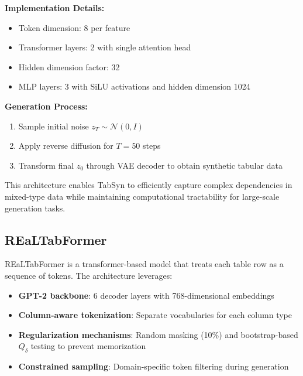 \documentclass[conference]{IEEEtran}
\begin{document}
\textbf{Implementation Details:}
\begin{itemize}
    \item Token dimension: 8 per feature
    \item Transformer layers: 2 with single attention head
    \item Hidden dimension factor: 32
    \item MLP layers: 3 with SiLU activations and hidden dimension 1024
\end{itemize}

\textbf{Generation Process:}
\begin{enumerate}
    \item Sample initial noise $z_T \sim \mathcal{N}(0, I)$
    \item Apply reverse diffusion for $T=50$ steps
    \item Transform final $z_0$ through VAE decoder to obtain synthetic tabular data
\end{enumerate}

This architecture enables TabSyn to efficiently capture complex dependencies in mixed-type data while maintaining computational tractability for large-scale generation tasks.


\subsection{REaLTabFormer}

REaLTabFormer \cite{solatorio2023realtabformer} is a transformer-based model that treats each table row as a sequence of tokens. The architecture leverages:
\begin{itemize}
    \item \textbf{GPT-2 backbone}: 6 decoder layers with 768-dimensional embeddings
    \item \textbf{Column-aware tokenization}: Separate vocabularies for each column type
    \item \textbf{Regularization mechanisms}: Random masking (10\%) and bootstrap-based $Q_\delta$ testing to prevent memorization
    \item \textbf{Constrained sampling}: Domain-specific token filtering during generation
\end{itemize}
\end{document}
